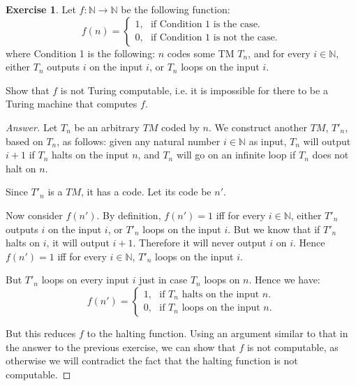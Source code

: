 \documentclass[11pt]{article}
\theoremstyle{definition}
\newtheorem{exer}{Exercise}
\begin{document}
\begin{exer}
Let $f: \mathbb{N} \rightarrow \mathbb{N}$ be the following function:
$$
f(n) = 
\begin{cases}
1, \, \, \, \, \text{if Condition 1 is the case.} \\
0, \, \, \, \, \text{if Condition 1 is not the case.}
\end{cases}
$$
where Condition 1 is the following: $n$ codes some TM $T_n$, and for every $i \in \mathbb{N}$, either $T_n$ outputs $i$ on the input $i$, or $T_n$ loops on the input $i$.

Show that $f$ is not Turing computable, i.e. it is impossible for there to be a Turing machine that computes $f$. 
\end{exer}

\begin{proof}[Answer]
Let $T_n$ be an arbitrary $TM$ coded by $n$. We construct another $TM$, $T'_n$, based on $T_n$, as follows: given any natural number $i \in \mathbb{N}$ as input, $T_n$ will output $i+1$ if $T_n$ halts on the input $n$, and $T_n$ will go on an infinite loop if $T_n$ does not halt on $n$.

Since $T'_n$ is a $TM$, it has a code. Let its code be $n'$.

Now consider $f(n')$. By definition, $f(n') = 1$ iff for every $i \in \mathbb{N}$, either $T'_n$ outputs $i$ on the input $i$, or $T'_n$ loops on the input $i$. But we know that if $T'_n$ halts on $i$, it will output $i+1$. Therefore it will never output $i$ on $i$. Hence $f(n') = 1$ iff for every $i \in \mathbb{N}$, $T'_n$ loops on the input $i$.

But $T'_n$ loops on every input $i$ just in case $T_n$ loops on $n$. Hence we have: 
$$
f(n') = 
\begin{cases}
1, \, \, \, \, \text{if $T_n$ halts on the input $n$.} \\
0, \, \, \, \, \text{if $T_n$ loops on the input $n$.}
\end{cases}
$$

But this reduces $f$ to the halting function. Using an argument similar to that in the answer to the previous exercise, we can show that $f$ is not computable, as otherwise we will contradict the fact that the halting function is not computable.

\end{proof}
\end{document}
